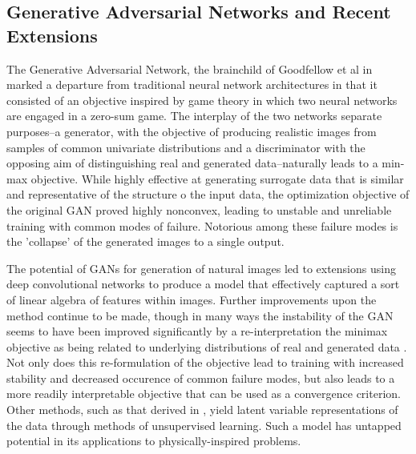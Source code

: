 \documentclass{article}
\begin{document}
\subsection{Generative Adversarial Networks and Recent Extensions}
	The Generative Adversarial Network, the brainchild of Goodfellow et al in \cite{Goodfellow2014GenerativeNetworks} marked a departure from traditional neural network architectures in that it consisted of an objective inspired by game theory in which two neural networks are engaged in a zero-sum game.  The interplay of the two networks separate purposes--a generator, with the objective of producing realistic images from samples of common univariate distributions and a  discriminator with the opposing aim of distinguishing real and generated data--naturally leads to a min-max objective.  While highly effective at generating surrogate data that is similar and representative of the structure o the input data, the optimization objective of the original GAN proved highly nonconvex, leading to unstable and unreliable training with common modes of failure.  Notorious among these failure modes is the 'collapse' of the generated images to a single output.

	The potential of GANs for generation of natural images led to extensions using deep convolutional networks to produce a model that effectively captured a sort of linear algebra of features within images.  Further improvements upon the method continue to be made, though in many ways the instability of the GAN seems to have been improved significantly by a re-interpretation the minimax objective as being related to underlying distributions of real and generated data \cite{Arjovsky2017WassersteinGAN}. Not only does this re-formulation of the objective lead to training with increased stability and decreased occurence of common failure modes, but also leads to a more readily interpretable objective that can be used as a convergence criterion. Other methods, such as that derived in \cite{Chen2016InfoGAN:Nets}, yield latent variable representations of the data through methods of unsupervised learning.  Such a model has untapped potential in its applications to physically-inspired problems.
\end{document}
